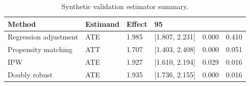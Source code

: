\begin{table}[t!]
\centering
\footnotesize
\caption{Synthetic validation estimator summary.}
\label{tab:paper-synthetic_validation_dataset-estimators}
\setlength{\tabcolsep}{4.5pt}
\begin{tabular}{llllll}
\hline
Method & Estimand & Effect & 95\\%
\hline
Regression adjustment & ATE & 1.985 & [1.807, 2.231] & 0.000 & 0.410 \\
Propensity matching & ATT & 1.707 & [1.403, 2.408] & 0.000 & 0.051 \\
IPW & ATE & 1.927 & [1.610, 2.194] & 0.029 & 0.016 \\
Doubly robust & ATE & 1.935 & [1.736, 2.155] & 0.000 & 0.016 \\
\hline
\end{tabular}
\end{table}
